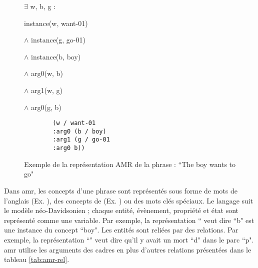 \documentclass{KodeBook}
\begin{document}
\begin{figure}[ht]
	\centering
	\begin{minipage}{.3\textwidth}
		
		\footnotesize
		$ \exists $ w, b, g : 
		
		instance(w, want-01) 
		
		$ \wedge $ instance(g, go-01) 
		
		$ \wedge $ instance(b, boy) 
		
		$ \wedge $ arg0(w, b) 
		
		$ \wedge $ arg1(w, g) 
		
		$ \wedge $ arg0(g, b)
	\end{minipage}
	\begin{minipage}{.35\textwidth}
		
		\begin{verbatim}
		(w / want-01
		:arg0 (b / boy)
		:arg1 (g / go-01
		:arg0 b))
		\end{verbatim}
		
	\end{minipage}
	\begin{minipage}{.3\textwidth}
		
	\end{minipage}
	\caption[Exemple d'une représentation AMR]{Exemple de la représentation AMR de la phrase : ``The boy wants to go"}
	\label{fig:amr-exp}
\end{figure}

Dans \ac{amr}, les concepts d'une phrase sont représentés sous forme de mots de l'anglais (Ex. ), des concepts de  (Ex. ) ou des mots clés spéciaux. 
Le langage suit le modèle néo-Davidsonien ; chaque entité, évènement, propriété et état sont représenté comme une variable. 
Par exemple, la représentation ``  veut dire ``b" est une instance du concept ``boy".
Les entités sont reliées par des relations.
Par exemple, la représentation ``" veut dire qu'il y avait un mort ``d" dans le parc ``p".
\ac{amr} utilise les arguments des cadres  en plus d'autres relations présentées dans le tableau \ref{tab:amr-rel}.
\end{document}
